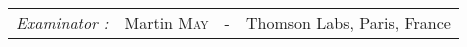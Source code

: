 \begin{titlepage}
\begin{center}
\begin{tabular}{llcl}
           \textit{Examinator :}   & Martin \textsc{May}          & - & Thomson Labs, Paris, France\\
      			      			\end{tabular}
\end{center}
\end{titlepage}
\sloppy

\titlepage